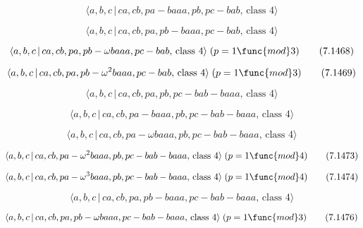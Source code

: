 \documentclass[10pt]{article}
\begin{document}
\begin{equation}
\langle a,b,c\,|\,ca,cb,pa-baaa,pb,pc-bab,\,\text{class }4\rangle 
\tag{7.1466}
\end{equation}

\begin{equation}
\langle a,b,c\,|\,ca,cb,pa,pb-baaa,pc-bab,\,\text{class }4\rangle 
\tag{7.1467}
\end{equation}

\begin{equation}
\langle a,b,c\,|\,ca,cb,pa,pb-\omega baaa,pc-bab,\,\text{class }4\rangle
\;(p=1\func{mod}3)  \tag{7.1468}
\end{equation}

\begin{equation}
\langle a,b,c\,|\,ca,cb,pa,pb-\omega ^{2}baaa,pc-bab,\,\text{class }4\rangle
\;(p=1\func{mod}3)  \tag{7.1469}
\end{equation}

\begin{equation}
\langle a,b,c\,|\,ca,cb,pa,pb,pc-bab-baaa,\,\text{class }4\rangle 
\tag{7.1470}
\end{equation}

\begin{equation}
\langle a,b,c\,|\,ca,cb,pa-baaa,pb,pc-bab-baaa,\,\text{class }4\rangle 
\tag{7.1471}
\end{equation}

\begin{equation}
\langle a,b,c\,|\,ca,cb,pa-\omega baaa,pb,pc-bab-baaa,\,\text{class }4\rangle
\tag{7.1472}
\end{equation}

\begin{equation}
\langle a,b,c\,|\,ca,cb,pa-\omega ^{2}baaa,pb,pc-bab-baaa,\,\text{class }%
4\rangle \;(p=1\func{mod}4)  \tag{7.1473}
\end{equation}

\begin{equation}
\langle a,b,c\,|\,ca,cb,pa-\omega ^{3}baaa,pb,pc-bab-baaa,\,\text{class }%
4\rangle \;(p=1\func{mod}4)  \tag{7.1474}
\end{equation}

\begin{equation}
\langle a,b,c\,|\,ca,cb,pa,pb-baaa,pc-bab-baaa,\,\text{class }4\rangle 
\tag{7.1475}
\end{equation}

\begin{equation}
\langle a,b,c\,|\,ca,cb,pa,pb-\omega baaa,pc-bab-baaa,\,\text{class }%
4\rangle \;(p=1\func{mod}3)  \tag{7.1476}
\end{equation}
\end{document}
